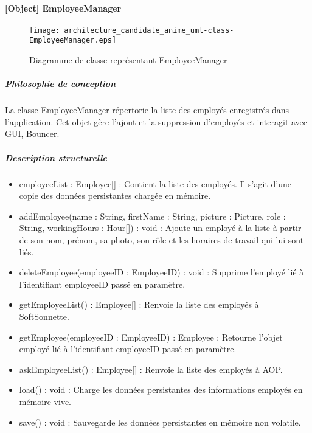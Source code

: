     \paragraph{[Object] EmployeeManager}%
    \begin{figure} [H]
        \centering
        \texttt{[image: architecture\_candidate\_anime\_uml-class-EmployeeManager.eps]}
        \caption{Diagramme de classe représentant EmployeeManager}
        \label{Classe_EmployeeManager}
    \end{figure}
        \subparagraph{Philosophie de conception}%
        La classe EmployeeManager répertorie la liste des employés enregistrés dans l'application.
        Cet objet gère l'ajout et la suppression d'employés et interagit avec GUI, Bouncer. 
        \subparagraph{Description structurelle}%
            \begin{itemize}
                \item {employeeList : Employee[] : Contient la liste des employés. 
                Il s'agit d'une copie des données persistantes chargée en mémoire.}
            \end{itemize}
            \begin{itemize}
                \item {addEmployee(name : String, firstName : String, picture : Picture, role : String, workingHours : Hour[]) : void : Ajoute un employé à la liste à partir de son nom, prénom, sa photo, son rôle et les horaires de travail qui lui sont liés.}
                \item {deleteEmployee(employeeID : EmployeeID) : void : Supprime l'employé lié à l'identifiant employeeID passé en paramètre.}
                \item {getEmployeeList() : Employee[] : Renvoie la liste des employés à SoftSonnette.}
                \item {getEmployee(employeeID : EmployeeID) : Employee : Retourne l'objet employé lié à l'identifiant employeeID passé en paramètre.}
                \item {askEmployeeList() : Employee[] : Renvoie la liste des employés à AOP.}
                \item {load() : void : Charge les données persistantes des informations employés en mémoire vive.}
                \item {save() : void : Sauvegarde les données persistantes en mémoire non volatile.}
            \end{itemize}


